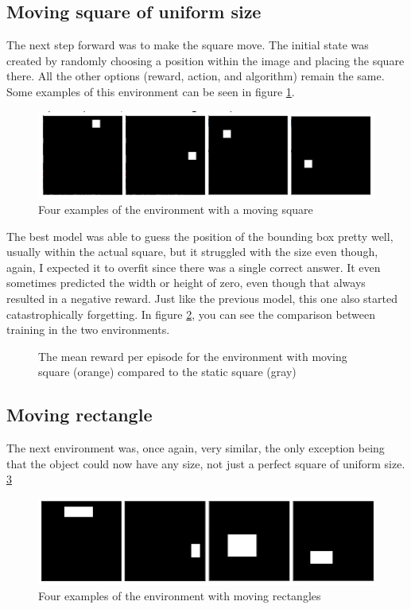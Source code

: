 \documentclass[
  digital,     %
  oneside,     %
  nosansbold,  %
  nocolorbold, %
  lof,         %
  lot,         %
]{fithesis4}
\begin{document}
\subsection{Moving square of uniform size}
The next step forward was to make the square move. The initial state was created by randomly choosing a position within the image and placing the square there. All the other options (reward, action, and algorithm) remain the same. Some examples of this environment can be seen in figure \ref{fig:env1}.

\begin{figure}
    \includegraphics[width=1\linewidth]{env_examples/env1.png}
    \caption{Four examples of the environment with a moving square}
    \label{fig:env1}
\end{figure}

The best model was able to guess the position of the bounding box pretty well, usually within the actual square, but it struggled with the size even though, again, I expected it to overfit since there was a single correct answer. It even sometimes predicted the width or height of zero, even though that always resulted in a negative reward. Just like the previous model, this one also started catastrophically forgetting. In figure \ref{fig:v1_rew}, you can see the comparison between training in the two environments.

\begin{figure}
    \centering
    \makebox[\textwidth][c]{}
    \caption{The mean reward per episode for the environment with moving square (orange) compared to the static square (gray)}
    \label{fig:v1_rew}
\end{figure}

\subsection{Moving rectangle}
The next environment was, once again, very similar, the only exception being that the object could now have any size, not just a perfect square of uniform size. \ref{fig:env2}

\begin{figure}
    \includegraphics[width=1\linewidth]{env_examples/env2.png}
    \caption{Four examples of the environment with moving rectangles}
    \label{fig:env2}
\end{figure}
\end{document}

